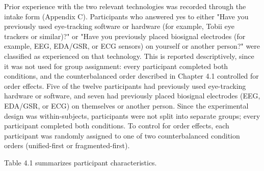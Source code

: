 \documentclass[
]{article}
\begin{document}
Prior experience with the two relevant technologies was recorded through the intake form (Appendix C). Participants who answered yes to either "Have you previously used eye-tracking software or hardware (for example, Tobii eye trackers or similar)?" or "Have you previously placed biosignal electrodes (for example, EEG, EDA/GSR, or ECG sensors) on yourself or another person?" were classified as experienced on that technology. This is reported descriptively, since it was not used for group assignment: every participant completed both conditions, and the counterbalanced order described in Chapter 4.1 controlled for order effects. Five of the twelve participants had previously used eye-tracking hardware or software, and seven had previously placed biosignal electrodes (EEG, EDA/GSR, or ECG) on themselves or another person. Since the experimental design was within-subjects, participants were not split into separate groups; every participant completed both conditions. To control for order effects, each participant was randomly assigned to one of two counterbalanced condition orders (unified-first or fragmented-first).

Table 4.1 summarizes participant characteristics.
\end{document}
